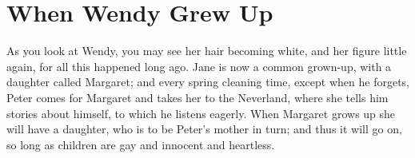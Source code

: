
\chapter{When Wendy Grew Up}

As you look at Wendy,
you may see her hair becoming white,
and her figure little again,
for all this happened long ago.
Jane is now a common grown-up,
with a daughter called Margaret;
and every spring cleaning time,
except when he forgets,
Peter comes for Margaret and takes her to the Neverland,
where she tells him stories about himself,
to which he listens eagerly.
When Margaret grows up she will have a daughter,
who is to be Peter’s mother in turn;
and thus it will go on,
so long as children are gay and innocent and heartless.
